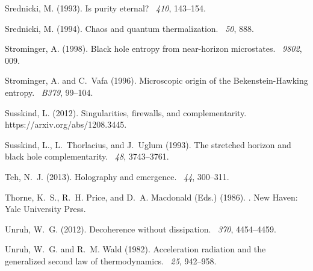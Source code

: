 \documentclass[12pt]{article}
\begin{document}
\begin{thebibliography}{}
Srednicki, M. (1993).
\newblock Is purity eternal?
~{\em 410}, 143--154.

Srednicki, M. (1994).
\newblock Chaos and quantum thermalization.
~{\em 50}, 888.

Strominger, A. (1998).
\newblock Black hole entropy from near-horizon microstates.
~{\em 9802}, 009.

Strominger, A. and C.~Vafa (1996).
\newblock Microscopic origin of the {B}ekenstein-{H}awking entropy.
~{\em B379}, 99--104.

Susskind, L. (2012).
\newblock Singularities, firewalls, and complementarity.
\newblock https://arxiv.org/abs/1208.3445.

Susskind, L., L.~Thorlacius, and J.~Uglum (1993).
\newblock The stretched horizon and black hole complementarity.
~{\em 48}, 3743--3761.

Teh, N.~J. (2013).
\newblock Holography and emergence.
~{\em 44},
  300--311.

Thorne, K.~S., R.~H. Price, and D.~A. Macdonald (Eds.) (1986).
.
\newblock New Haven: Yale University Press.

Unruh, W.~G. (2012).
\newblock Decoherence without dissipation.
~{\em 370}, 4454--4459.

Unruh, W.~G. and R.~M. Wald (1982).
\newblock Acceleration radiation and the generalized second law of
  thermodynamics.
~{\em 25}, 942--958.


\end{thebibliography}
\end{document}
